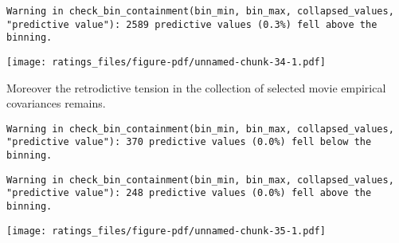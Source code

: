 \documentclass[
  letterpaper,
  DIV=11,
  numbers=noendperiod]{scrartcl}
\newenvironment{Shaded}{\begin{snugshade}}{\end{snugshade}}
\newcommand{\AttributeTok}[1]{\textcolor[rgb]{0.40,0.45,0.13}{#1}}
\newcommand{\DecValTok}[1]{\textcolor[rgb]{0.68,0.00,0.00}{#1}}
\newcommand{\FloatTok}[1]{\textcolor[rgb]{0.68,0.00,0.00}{#1}}
\newcommand{\FunctionTok}[1]{\textcolor[rgb]{0.28,0.35,0.67}{#1}}
\newcommand{\NormalTok}[1]{\textcolor[rgb]{0.00,0.23,0.31}{#1}}
\newcommand{\OtherTok}[1]{\textcolor[rgb]{0.00,0.23,0.31}{#1}}
\newcommand{\SpecialCharTok}[1]{\textcolor[rgb]{0.37,0.37,0.37}{#1}}
\newcommand{\StringTok}[1]{\textcolor[rgb]{0.13,0.47,0.30}{#1}}
\begin{document}
\begin{verbatim}
Warning in check_bin_containment(bin_min, bin_max, collapsed_values,
"predictive value"): 2589 predictive values (0.3%) fell above the binning.
\end{verbatim}

\texttt{[image: ratings\_files/figure-pdf/unnamed-chunk-34-1.pdf]}

Moreover the retrodictive tension in the collection of selected movie
empirical covariances remains.

\begin{Shaded}
\end{Shaded}

\begin{verbatim}
Warning in check_bin_containment(bin_min, bin_max, collapsed_values,
"predictive value"): 370 predictive values (0.0%) fell below the binning.
\end{verbatim}

\begin{verbatim}
Warning in check_bin_containment(bin_min, bin_max, collapsed_values,
"predictive value"): 248 predictive values (0.0%) fell above the binning.
\end{verbatim}

\texttt{[image: ratings\_files/figure-pdf/unnamed-chunk-35-1.pdf]}
\end{document}
